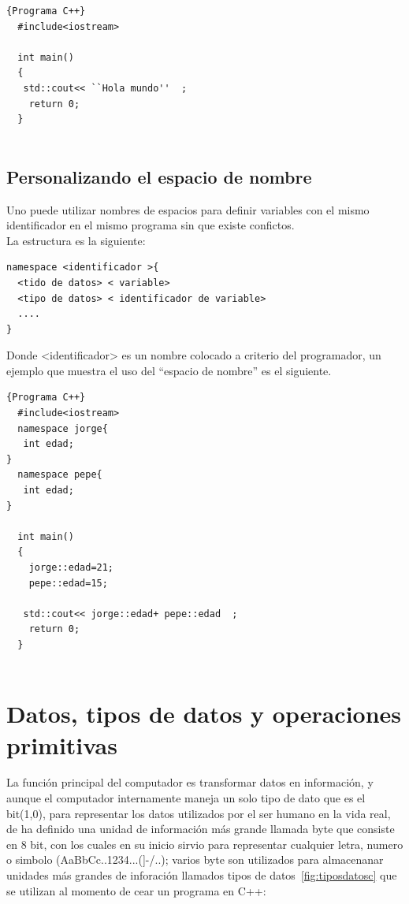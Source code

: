 \documentclass[a4paper,12pt,spanish]{article}
\begin{document}
\begin{lstlisting}[frame=trBL]{Programa C++}
  #include<iostream>

  int main()
  {
   std::cout<< ``Hola mundo''  ;
    return 0;
  }
  
\end{lstlisting}

\subsection{Personalizando el espacio de nombre}
\label{sec:pers-el-espac}
Uno puede utilizar nombres de espacios para definir variables
con el mismo identificador en el mismo programa sin que existe confictos. \\

La estructura es la siguiente:

\begin{verbatim}
namespace <identificador >{
  <tido de datos> < variable>
  <tipo de datos> < identificador de variable>
  ....
}
\end{verbatim}

Donde <identificador> es un nombre colocado a criterio del programador, un ejemplo que muestra el uso del ``espacio de nombre'' es el siguiente.\\

\begin{lstlisting}[frame=trBL,firstnumber=1]{Programa C++}
  #include<iostream>
  namespace jorge{
   int edad;
}
  namespace pepe{
   int edad;
}
  
  int main()
  {
    jorge::edad=21;
    pepe::edad=15;
 
   std::cout<< jorge::edad+ pepe::edad  ;
    return 0;
  }
  
\end{lstlisting}


\section{Datos, tipos de datos y operaciones primitivas}
\label{sec:datos-tipo-opera}

La función principal del computador es transformar datos en información, y aunque el computador internamente maneja un solo tipo de dato que es el bit(1,0), para representar los datos utilizados por el ser humano en la vida real, de ha definido una unidad de información más grande llamada byte que consiste en 8 bit, con los cuales en su inicio sirvio para representar cualquier letra, numero o simbolo (AaBbCc..1234...(]-/..); varios byte son utilizados para almacenanar unidades más grandes de inforación llamados tipos de datos~\ref{fig:tiposdatosc} que se utilizan al momento de cear un programa en C++:\\
\end{document}

